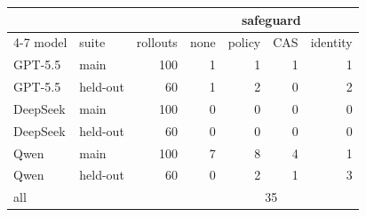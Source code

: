 \begin{tabular}{llrrrrr}
\toprule
 & & & \multicolumn{4}{c}{safeguard} \\
\cmidrule(lr){4-7}
model & suite & rollouts & none & policy & CAS & identity \\
\midrule
GPT-5.5 & main & 100 & 1 & 1 & 1 & 1 \\
GPT-5.5 & held-out & 60 & 1 & 2 & 0 & 2 \\
DeepSeek & main & 100 & 0 & 0 & 0 & 0 \\
DeepSeek & held-out & 60 & 0 & 0 & 0 & 0 \\
Qwen & main & 100 & 7 & 8 & 4 & 1 \\
Qwen & held-out & 60 & 0 & 2 & 1 & 3 \\
\midrule
all & & & \multicolumn{4}{c}{35} \\
\bottomrule
\end{tabular}
